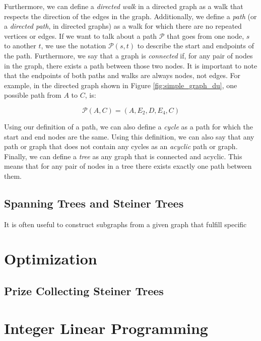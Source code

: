 \documentclass[12pt,twoside]{reedthesis}
\theoremstyle{definition}
\begin{document}
{   Furthermore, we can define a \textit{directed walk} in a directed graph as a walk that respects the direction of the edges in the graph. Additionally, we define a \textit{path} (or a \textit{directed path}, in directed graphs) as a walk for which there are no repeated vertices or edges. If we want to talk about a path $\mathcal{P}$ that goes from one node, $s$ to another $t$, we use the notation $\mathcal{P}(s,t)$ to describe the start and endpoints of the path. Furthermore, we say that a graph is \textit{connected} if, for any pair of nodes in the graph, there exists a path between those two nodes. It is important to note that the endpoints of both paths and walks are always nodes, not edges. For example, in the directed graph shown in Figure \ref{fig:simple_graph_du}, one possible path from $A$ to $C$, is:\par

   \begin{equation*}
     \mathcal{P}(A,C) = (A,E_2,D,E_4,C)
   \end{equation*}

   Using our definition of a path, we can also define a \textit{cycle} as a path for which the start and end nodes are the same. Using this definition, we can also say that any path or graph that does not contain any cycles as an \textit{acyclic} path or graph. Finally, we can define a \textit{tree} as any graph that is connected and acyclic. This means that for any pair of nodes in a tree there exists exactly one path between them.\par

   \subsection{Spanning Trees and Steiner Trees}

   It is often useful to construct subgraphs from a given graph that fulfill specific 

 \section{Optimization}

  \subsection{Prize Collecting Steiner Trees}

 \section{Integer Linear Programming}

}
\end{document}
